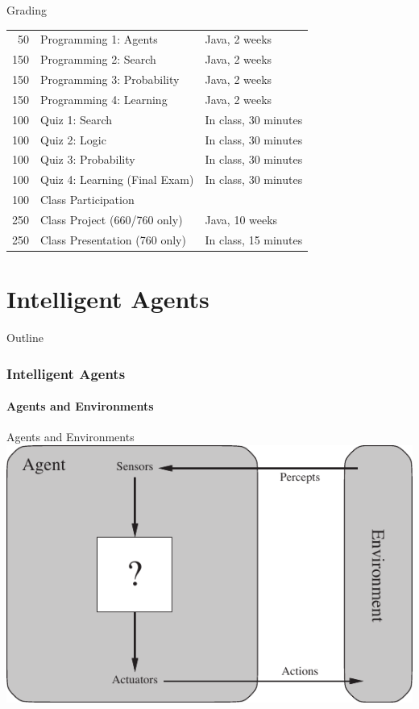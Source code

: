 \documentclass[14pt]{beamer}
\begin{document}
\begin{frame}{Grading}
\begin{tabular}{@{} r l l @{}}
\hline
 50 & Programming 1: Agents & Java, 2 weeks \\
150 & Programming 2: Search & Java, 2 weeks  \\
150 & Programming 3: Probability & Java, 2 weeks  \\
150 & Programming 4: Learning & Java, 2 weeks  \\
\hline
100 & Quiz 1: Search & In class, 30 minutes \\
100 & Quiz 2: Logic & In class, 30 minutes \\
100 & Quiz 3: Probability & In class, 30 minutes \\
100 & Quiz 4: Learning (Final Exam) & In class, 30 minutes \\
\hline
100 & Class Participation \\
\hline
250 & Class Project (\alert{660/760 only}) & Java, 10 weeks \\
250 & Class Presentation (\alert{760 only}) & In class, 15 minutes \\
\hline
\end{tabular}
\end{frame}

\part{Intelligent Agents}
\begin{frame}{Outline}
  \tableofcontents
\end{frame}

\section{Intelligent Agents}
\subsection{Agents and Environments}

\begin{frame}{Agents and Environments}
	\includegraphics[width=\textwidth]{agent-environment.pdf}
\end{frame}
\end{document}
